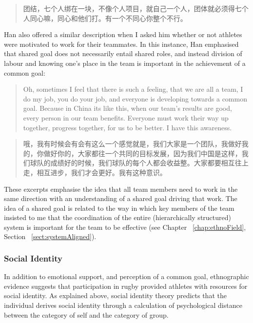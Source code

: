 \begin{CJK}{UTF8}{gbsn}
  \begin{quotation}
    团结，七个人绑在一块，不像个人项目，就自己一个人，团体就必须得七个人同心嘛，同心和他们打。有一个不同心你整个不行。
  \end{quotation}

  Han also offered a similar description when I asked him whether or not athletes were motivated to work for their teammates. In this instance, Han emphasised that shared goal does not necessarily  entail shared roles, and instead division of labour and knowing one's place in the team is important in the achievement of a common goal:

    \begin{quotation}
        Oh, sometimes I feel that there is such a feeling, that we are all a team, I do my job, you do your job, and everyone is developing towards a common goal.  Because in China its like this, when our team’s results are good, every person in our team benefits.  Everyone must work their way up together, progress together, for us to be better. I have this awareness.
    \end{quotation}

  \begin{quotation}
      	哦，我有时候会有会有这么一个感觉就是，我们大家是一个团队，我做好我的，你做好你的，大家都往一个共同的目标发展，因为我们中国是这样，我们球队的成绩好的时候，我们球队的每个人都会收益整。大家都要相互往上走，相互进步，我们才会更好。我有这种意识。 
  \end{quotation}

These excerpts emphasise the idea that all team members need to work in the same direction with an understanding of a shared goal driving that work.  The idea of a shared goal is related to the way in which key members of the team insisted to me that the coordination of the entire (hierarchically structured) system is important for the team to be effective (see Chapter ~\ref{chap:ethnoField}, Section ~\ref{sect:systemAligned}).




\subsubsection{Social Identity\label{sect:socialIdentity}}

In addition to emotional support, and perception of a common goal, ethnographic evidence suggests that participation in rugby provided athletes with resources for social identity.  As explained above, social identity theory predicts that the individual derives social identity through a calculation of psychological distance between the category of self and the category of group.


\end{CJK}
